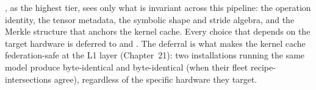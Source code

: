 , as the highest tier, sees only what is invariant across this pipeline: the operation identity, the tensor metadata, the symbolic shape and stride algebra, and the Merkle structure that anchors the kernel cache.
Every choice that depends on the target hardware is deferred to  and .
The deferral is what makes the kernel cache federation-safe at the L1 layer (Chapter~21): two installations running the same model produce byte-identical  and byte-identical  (when their fleet recipe-intersections agree), regardless of the specific hardware they target.
